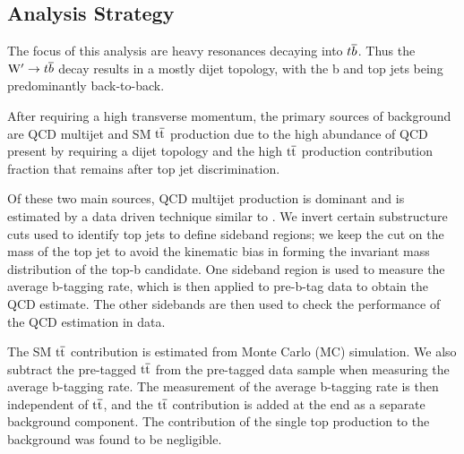 \subsection{Analysis Strategy}
\label{sec:analysisStrategy}


The focus of this analysis are heavy resonances decaying into
${t\overline{b}}$.  Thus the $\mathrm{W}^\prime \to {t\overline{b}}$ decay results in a mostly
dijet topology, with the b and top jets being  predominantly back-to-back. 

After requiring a high transverse momentum, 
the primary sources of background are QCD multijet and SM $\mathrm{t\overline{t}}$ 
production due to the high abundance of QCD present by requiring a dijet topology and the high $\mathrm{t\overline{t}}$ production contribution fraction that remains after top jet discrimination. 

Of these two main sources, QCD multijet production is dominant and is estimated by a data driven technique similar 
to \cite{7tevZprime}.  We
invert certain substructure cuts used to identify top jets
to define sideband regions; we keep the cut on the mass of the
top jet to avoid the kinematic bias in forming the invariant mass
distribution of the top-b candidate.  One sideband region is used
to measure the average b-tagging rate, which is then applied to
pre-b-tag data to obtain the QCD estimate.  The other sidebands are
then used to check the performance of the QCD estimation in data.

The SM $\mathrm{t\overline{t}}$ contribution is estimated from Monte Carlo (MC) simulation.
We also subtract the pre-tagged $\mathrm{t\overline{t}}$ from the pre-tagged data sample when
measuring the average b-tagging rate.  The measurement
of the average b-tagging rate is then independent of $\mathrm{t\overline{t}}$, and the 
$\mathrm{t\overline{t}}$ contribution is added at the end as a separate background
component.
The contribution of the single top production to the background was
found to be negligible.

